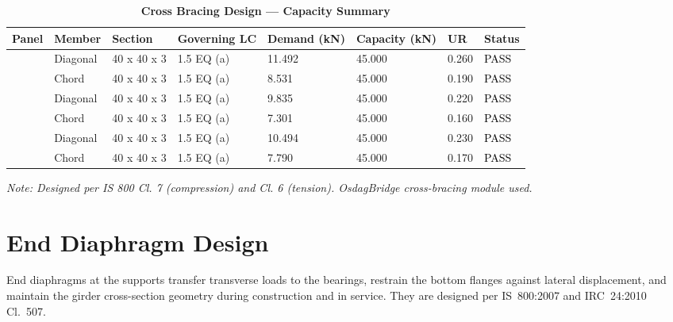 \documentclass[12pt,a4paper]{report}
\numberwithin{table}{chapter}
\numberwithin{figure}{chapter}
\begin{document}
\vspace{1em}
\begin{longtable}{|C{2.0cm}|L{1.8cm}|C{2.2cm}|C{3.0cm}|C{1.8cm}|C{1.8cm}|C{1.2cm}|C{1.8cm}|}
\caption{\textbf{Cross Bracing Design --- Capacity Summary}}
\hline
\textbf{Panel} & \textbf{Member} & \textbf{Section} & \textbf{Governing LC} & \textbf{Demand (kN)} & \textbf{Capacity (kN)} & \textbf{UR} & \textbf{Status} \\[6pt]
\hline
{} & Diagonal & 40 x 40 x 3 & 1.5 EQ (a) & 11.492 & 45.000 & 0.260 & \textcolor{black}{PASS} \\[6pt]
 & Chord & 40 x 40 x 3 & 1.5 EQ (a) & 8.531 & 45.000 & 0.190 & \textcolor{black}{PASS} \\[6pt]
\hline
{} & Diagonal & 40 x 40 x 3 & 1.5 EQ (a) & 9.835 & 45.000 & 0.220 & \textcolor{black}{PASS} \\[6pt]
 & Chord & 40 x 40 x 3 & 1.5 EQ (a) & 7.301 & 45.000 & 0.160 & \textcolor{black}{PASS} \\[6pt]
\hline
{} & Diagonal & 40 x 40 x 3 & 1.5 EQ (a) & 10.494 & 45.000 & 0.230 & \textcolor{black}{PASS} \\[6pt]
 & Chord & 40 x 40 x 3 & 1.5 EQ (a) & 7.790 & 45.000 & 0.170 & \textcolor{black}{PASS} \\[6pt]
\hline
\end{longtable}
\noindent\textit{Note: Designed per IS 800 Cl. 7 (compression) and Cl. 6 (tension). OsdagBridge cross-bracing module used.}

\section{End Diaphragm Design}
\label{sec:end-diaphragm}

End diaphragms at the supports transfer transverse loads to the bearings, restrain the bottom flanges against lateral displacement, and maintain the girder cross-section geometry during construction and in service. They are designed per IS~800:2007 and IRC~24:2010 Cl.~507.

\vspace{1em}

\vspace{0.4em}
\noindent
\setlength{\tabcolsep}{4pt}
\setlength{\LTleft}{0pt}
\setlength{\LTright}{\fill}
\end{document}
